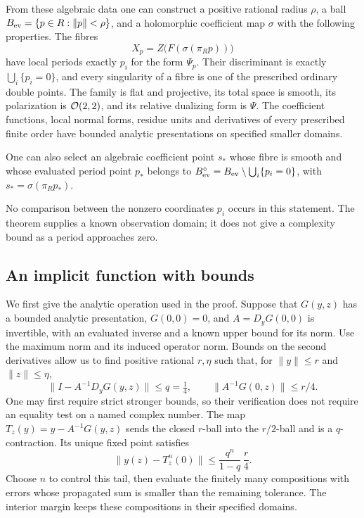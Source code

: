 \begin{theorem}\label{thm:evaluated-periods}
From these algebraic data one can construct a positive rational radius
$\rho$, a ball $B_{\rm ev}=\{p\in R:\|p\|<\rho\}$, and a
holomorphic coefficient map $\sigma$ with the following properties.
The fibres
\[
 X_p=Z\bigl(F(\sigma(\pi_Rp))\bigr)
\]
have local periods exactly $p_i$ for the form $\Psi_p$. Their
discriminant is exactly $\bigcup_i\{p_i=0\}$, and every singularity
of a fibre is one of the prescribed ordinary double points.
The family is flat and projective, its total space is smooth, its
polarization is $\mathcal O(2,2)$, and its relative dualizing form is $\Psi$.
The coefficient functions, local normal forms, residue units and
derivatives of every prescribed finite order have bounded analytic
presentations on specified smaller domains.

One can also select an algebraic coefficient point $s_*$ whose fibre
is smooth and whose evaluated period point $p_*$ belongs to
$B_{\rm ev}^{\circ}=B_{\rm ev}\setminus\bigcup_i\{p_i=0\}$,
with $s_* = \sigma(\pi_Rp_*)$.
\end{theorem}

No comparison between the nonzero coordinates $p_i$ occurs in this
statement. The theorem supplies a known observation domain; it does
not give a complexity bound as a period approaches zero.

\subsection{An implicit function with bounds}

We first give the analytic operation used in the proof. Suppose that
$G(y,z)$ has a bounded analytic presentation, $G(0,0)=0$, and
$A=D_yG(0,0)$ is invertible, with an evaluated inverse and a known
upper bound for its norm. Use the maximum norm and its induced
operator norm. Bounds on the second derivatives allow us to find
positive rational $r,\eta$ such that, for $\|y\|\le r$ and
$\|z\|\le\eta$,
\begin{equation}\label{eq:implicit-bounds}
 \|I-A^{-1}D_yG(y,z)\|\le q=\tfrac14,
 \qquad \|A^{-1}G(0,z)\|\le r/4.
\end{equation}
One may first require strict stronger bounds, so their verification
does not require an equality test on a named complex number.
The map $T_z(y)=y-A^{-1}G(y,z)$ sends the closed $r$-ball into
the $r/2$-ball and is a $q$-contraction. Its unique fixed point satisfies
\begin{equation}\label{eq:implicit-tail}
 \|y(z)-T_z^n(0)\|
       \le \frac{q^n}{1-q}\,\frac r4.
\end{equation}
Choose $n$ to control this tail, then evaluate the finitely many
compositions with errors whose propagated sum is smaller than the
remaining tolerance. The interior margin keeps these compositions
in their specified domains.

